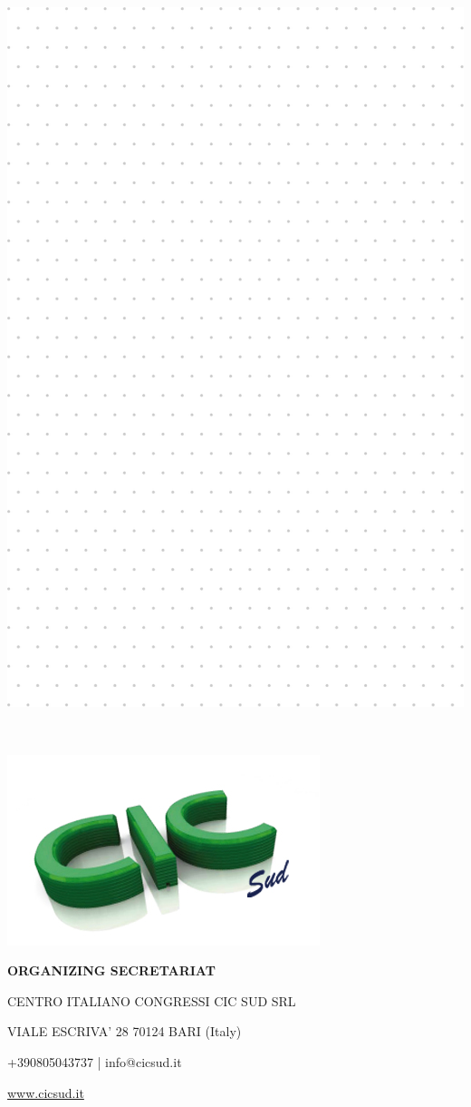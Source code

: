 \documentclass[
	openany, %
	parskip=full, %
	12pt, %
	a4paper, %
]{conferencebooklet} %
\begin{document}
\newpage
\includegraphics[width=\textwidth]{notes/notes-rest.pdf}


 
\newpage

~\vfill %

\begin{center}

\includegraphics[width=0.25\linewidth]{logos/cic.jpg}

\textbf{ORGANIZING SECRETARIAT}

CENTRO ITALIANO CONGRESSI CIC SUD SRL

VIALE ESCRIVA’ 28 70124 BARI (Italy)

+390805043737 | info@cicsud.it

\url{www.cicsud.it}
\end{center}
\end{document}
